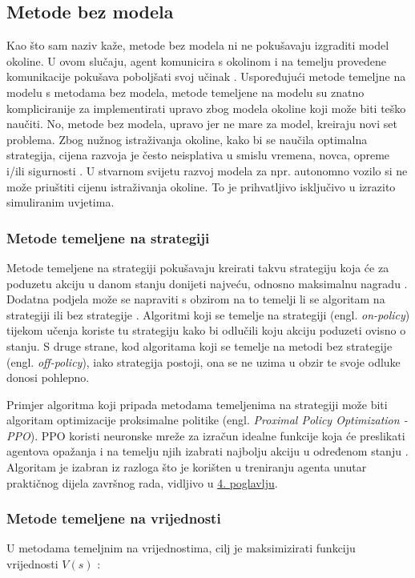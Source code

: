 \documentclass[]{foi} %
\begin{document}
\subsection{Metode bez modela}
Kao što sam naziv kaže, metode bez modela ni ne pokušavaju izgraditi model okoline. U ovom slučaju, agent komunicira s okolinom i na temelju provedene komunikacije pokušava poboljšati svoj učinak \cite[poglavlje 3]{DeepRL}. Uspoređujući metode temeljne na modelu s metodama bez modela, metode temeljene na modelu su znatno kompliciranije za implementirati upravo zbog modela okoline koji može biti teško naučiti. No, metode bez modela, upravo jer ne mare za model, kreiraju novi set problema. Zbog nužnog istraživanja okoline, kako bi se naučila optimalna strategija, cijena razvoja je često neisplativa u smislu vremena, novca, opreme i/ili sigurnosti \cite[poglavlje 3]{DeepRL}. U stvarnom svijetu razvoj modela za npr. autonomno vozilo si ne može priuštiti cijenu istraživanja okoline. To je prihvatljivo isključivo u izrazito simuliranim uvjetima.

\subsubsection{Metode temeljene na strategiji}
Metode temeljene na strategiji pokušavaju kreirati takvu strategiju koja će za poduzetu akciju u danom stanju donijeti najveću, odnosno maksimalnu nagradu \cite[poglavlje 3]{DeepRL}. Dodatna podjela može se napraviti s obzirom na to temelji li se algoritam na strategiji ili bez strategije \cite[str. 73]{AIandGames}. Algoritmi koji se temelje na strategiji (engl. \textit{on-policy}) tijekom učenja koriste tu strategiju kako bi odlučili koju akciju poduzeti ovisno o stanju. S druge strane, kod algoritama koji se temelje na metodi bez strategije (engl. \textit{off-policy}), iako strategija postoji, ona se ne uzima u obzir te svoje odluke donosi pohlepno.

Primjer algoritma koji pripada metodama temeljenima na strategiji može biti algoritam optimizacije proksimalne politike (engl. \textit{Proximal Policy Optimization - PPO}). PPO koristi neuronske mreže za izračun idealne funkcije koja će preslikati agentova opažanja i na temelju njih izabrati najbolju akciju u određenom stanju \cite{githubPPO}. Algoritam je izabran iz razloga što je korišten u treniranju agenta unutar praktičnog dijela završnog rada, vidljivo u \hyperref[cha: primjena]{4. poglavlju}.

\subsubsection{Metode temeljene na vrijednosti}
U metodama temeljnim na vrijednostima, cilj je maksimizirati funkciju vrijednosti $V (s)$ \cite{valueBased}:
\end{document}
